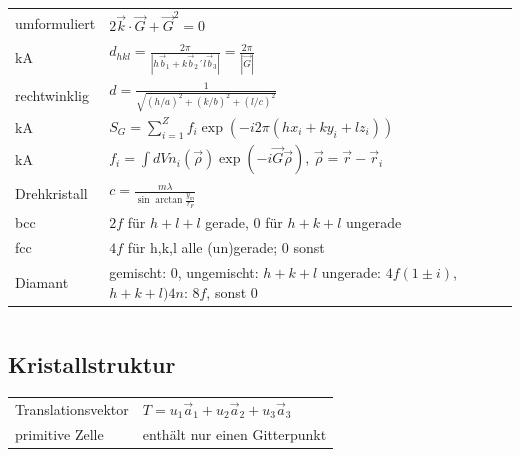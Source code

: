 \documentclass[12pt,a4paper]{article}
\renewcommand{\=}[1]{\stackrel{#1}{=}}
\theoremstyle{definition}
\theoremstyle{remark}
\begin{document}
\begin{minipage}[t]{.5\linewidth}
\begin{tabular}{ll}
umformuliert & $2 \vec k \cdot \vec G + \vec{G}^2 = 0$\\
kA & $d_{hkl} = \frac{2\pi}{|h \vec b_1 + k \vec b_2 ´l \vec b_3|} = \frac{2\pi}{|\vec G|}$\\
rechtwinklig & $d = \frac{1}{\sqrt{(h/a)^2 + (k/b)^2 + (l/c)^2}}$\\
kA & $S_G = \sum_{i = 1}^Z f_i \exp (-i 2\pi (h x_i + k y_i + l z_i))$\\
kA & $f_i = \int dV n_i (\vec \rho) \exp (- i \vec G \vec \rho)$, $\vec \rho = \vec r - \vec r_i$\\
Drehkristall & $c = \frac{m\lambda}{\sin \arctan \frac{y_m}{r_F}}$\\
bcc & $2f$ für $h+l+l$ gerade, $0$ für $h+k+l$ ungerade\\
fcc & $4f$ für h,k,l alle (un)gerade; 0 sonst\\
Diamant & gemischt: 0, ungemischt: $h+k+l$ ungerade: $4f(1\pm i)$, $h+k+l ) 4n$: $8f$, sonst 0\\
\bottomrule
\end{tabular}
\end{minipage}%
\begin{minipage}[t]{.65\linewidth}
\vspace{0pt}
\begin{tabular}{ll}
\toprule


\end{tabular}
\end{minipage}




\subsection{Kristallstruktur}

\begin{minipage}[t]{.5\linewidth}
\vspace{0pt}
\begin{tabular}{ll}
Translationsvektor & $T = u_1 \vec a_1 + u_2 \vec a_2 + u_3 \vec a_3$\\
primitive Zelle & enthält nur einen Gitterpunkt\\

\end{tabular}
\end{minipage}%
\begin{minipage}[t]{.5\linewidth}
\vspace{0pt}
\begin{tabular}{ll}
\toprule


\end{tabular}
\end{minipage}
\end{document}
